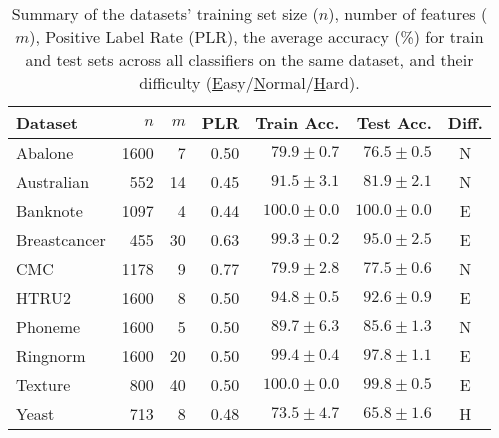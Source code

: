 \begin{table}[t!]
    \footnotesize
    \centering
    \caption{Summary of the datasets' training set size ($n$), number of features ($m$), Positive Label Rate (PLR), the average accuracy (\%) for train and test sets across all classifiers on the same dataset, and their difficulty (\underline{E}asy/\underline{N}ormal/\underline{H}ard). 
    }
    \begin{tabular}{l|r|r|r|r|r|c}
        \toprule
        Dataset      & $n$  & $m$ & PLR  & Train Acc. & Test Acc. & Diff. \\
        \midrule                                                                 
        Abalone      & 1600 & 7   & 0.50 & $79.9\pm0.7$ &  $76.5\pm0.5$     & N \\
        Australian   & 552  & 14  & 0.45 & $91.5\pm3.1$ &  $81.9\pm2.1$     & N \\
        Banknote     & 1097 & 4   & 0.44 & $100.0\pm0.0$ & $100.0\pm0.0$    & E \\
        Breastcancer & 455  & 30  & 0.63 & $99.3\pm0.2$ &  $95.0\pm2.5$     & E \\
        CMC          & 1178 & 9   & 0.77 & $79.9\pm2.8$ &  $77.5\pm0.6$     & N \\
        HTRU2        & 1600 & 8   & 0.50 & $94.8\pm0.5$ &  $92.6\pm0.9$     & E \\
        Phoneme      & 1600 & 5   & 0.50 & $89.7\pm6.3$ &  $85.6\pm1.3$     & N \\
        Ringnorm     & 1600 & 20  & 0.50 & $99.4\pm0.4$ &  $97.8\pm1.1$     & E \\
        Texture      & 800  & 40  & 0.50 & $100.0\pm0.0$ &  $99.8\pm0.5$    & E \\
        Yeast        & 713  & 8   & 0.48 & $73.5\pm4.7$ &  $65.8\pm1.6$     & H \\
        \bottomrule
    \end{tabular}
    \label{tab.datasets}
\end{table}
